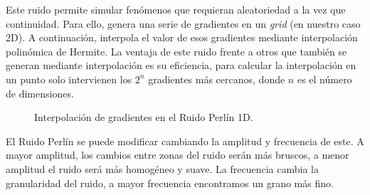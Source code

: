 Este ruido permite simular fenómenos que requieran aleatoriedad a la vez que continuidad. Para ello, genera una serie de gradientes en un \textit{grid} (en nuestro caso 2D). A continuación, interpola el valor de esos gradientes mediante interpolación polinómica de Hermite. La ventaja de este ruido frente a otros que también se generan mediante interpolación es su eficiencia, para calcular la interpolación en un punto solo intervienen los $2^n$ gradientes más cercanos, donde $n$ es el número de dimensiones. \cite{computer-graphics-epfl}

\begin{figure}[H]
\centering
    \caption{Interpolación de gradientes en el Ruido Perlín 1D. \cite{computer-graphics-epfl}}
\end{figure}

El Ruido Perlín se puede modificar cambiando la amplitud y frecuencia de este. A mayor amplitud, los cambios entre zonas del ruido serán más bruscos, a menor amplitud el ruido será más homogéneo y suave. La frecuencia cambia la granularidad del ruido, a mayor frecuencia encontramos un grano más fino. 

